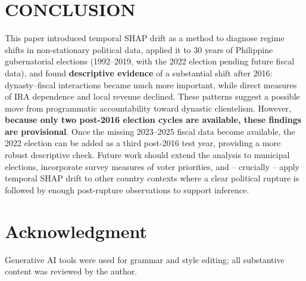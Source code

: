 \documentclass[conference]{IEEEtran}
\begin{document}
\section{CONCLUSION}

This paper introduced temporal SHAP drift as a method to diagnose regime shifts in non-stationary political data, applied it to 30 years of Philippine gubernatorial elections (1992–2019, with the 2022 election pending future fiscal data), and found \textbf{descriptive evidence} of a substantial shift after 2016: dynasty–fiscal interactions became much more important, while direct measures of IRA dependence and local revenue declined. These patterns suggest a possible move from programmatic accountability toward dynastic clientelism. However, \textbf{because only two post-2016 election cycles are available, these findings are provisional}. Once the missing 2023–2025 fiscal data become available, the 2022 election can be added as a third post‑2016 test year, providing a more robust descriptive check. Future work should extend the analysis to municipal elections, incorporate survey measures of voter priorities, and – crucially – apply temporal SHAP drift to other country contexts where a clear political rupture is followed by enough post‑rupture observations to support inference.

\section*{Acknowledgment}
Generative AI tools were used for grammar and style editing; all substantive content was reviewed by the author.
\end{document}
